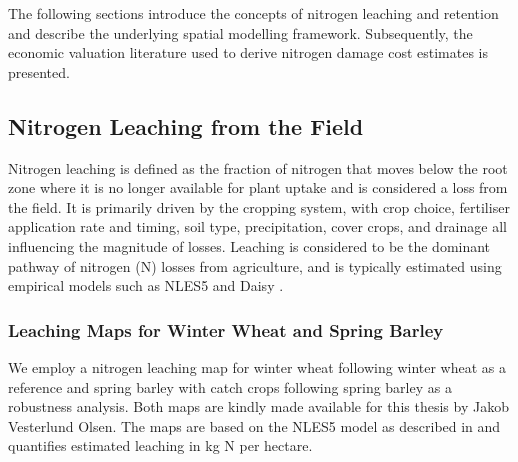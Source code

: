 \documentclass[12pt]{article}
\begin{document}



The following sections introduce the concepts of nitrogen leaching and retention and describe the underlying spatial modelling framework. Subsequently, the economic valuation literature used to derive nitrogen damage cost estimates is presented.

\subsection{Nitrogen Leaching from the Field}
Nitrogen leaching is defined as the fraction of nitrogen that moves below the root zone where it is no longer available for plant uptake and is considered a loss from the field. It is primarily driven by the cropping system, with crop choice, fertiliser application rate and timing, soil type, precipitation, cover crops, and drainage all influencing the magnitude of losses. Leaching is considered to be the dominant pathway of nitrogen (N) losses from agriculture, and is typically estimated using empirical models such as NLES5 and Daisy \citep{Borgesen2020}.

\subsubsection{Leaching Maps for Winter Wheat and Spring Barley}
\label{Leaching Map for Continuous Winter Wheat and Spring Barley}

We employ a nitrogen leaching map for winter wheat following winter wheat as a reference \citep{Olsen2026}  and spring barley with catch crops following spring barley \citep[unpublished]{OlsenNd} as a robustness analysis. Both maps are kindly made available for this thesis by Jakob Vesterlund Olsen. The maps are based on the NLES5 model as described in \cite{Borgesen2020} and quantifies estimated leaching in kg N per hectare.
\end{document}
